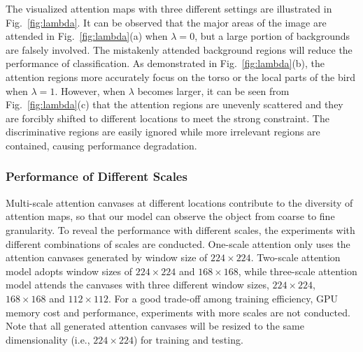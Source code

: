 \documentclass[journal]{IEEEtran}
\begin{document}
The visualized attention maps with three different settings are illustrated in Fig.~\ref{fig:lambda}. It can be observed that the major areas of the image are attended in Fig.~\ref{fig:lambda}(a) when $\lambda=0$, but a large portion of backgrounds are falsely involved. The mistakenly attended background regions will reduce the performance of classification. As demonstrated in Fig.~\ref{fig:lambda}(b), the attention regions more accurately focus on the torso or the local parts of the bird when $\lambda=1$. However, when $\lambda$ becomes larger, it can be seen from Fig.~\ref{fig:lambda}(c) that the attention regions are unevenly scattered and they are forcibly shifted to different locations to meet the strong constraint. The discriminative regions are easily ignored while more irrelevant regions are contained, causing performance degradation.


\subsubsection{Performance of Different Scales}
Multi-scale attention canvases at different locations contribute to the diversity of attention maps, so that our model can observe the object from coarse to fine granularity. To reveal the performance with different scales, the experiments with different combinations of scales are conducted. One-scale attention only uses the attention canvases generated by window size of $224 \times 224$. Two-scale attention model adopts window sizes of $224 \times 224$ and $168 \times 168$, while three-scale attention model attends the canvases with three different window sizes, $224 \times 224$, $168\times 168$ and $112\times 112$. For a good trade-off among training efficiency, GPU memory cost and performance, experiments with more scales are not conducted. Note that all generated attention canvases will be resized to the same dimensionality (i.e., $224\times 224$) for training and testing. 
\end{document}
